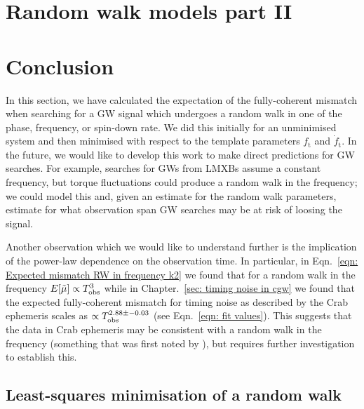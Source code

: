 \documentclass[../full_thesis/full_thesis.tex]{subfiles}
\newcommand{\thisdir}{../analytic_timing_noise_cgw}
\begin{document}
\section{Random walk models part II} 
\label{sec: Random walk models part II}


\section{Conclusion}

In this section, we have calculated the expectation of the fully-coherent
mismatch when searching for a GW signal which undergoes a random walk in one of
the phase, frequency, or spin-down rate. We did this initially for an
unminimised system and then minimised with respect to the template parameters
$f_\textrm{t}$ and $\dot{f}_\textrm{t}$. In the future, we would like to develop
this work to make direct predictions for GW searches. For example,
searches for GWs from LMXBs assume a constant frequency, but torque fluctuations
could produce a random walk in the frequency; we could model this and, given
an estimate for the random walk parameters, estimate for what observation span
GW searches may be at risk of loosing the signal.

Another observation which we would like to understand further is the
implication of the power-law dependence on the observation time. In particular,
in Eqn.~\eqref{eqn: Expected mismatch RW in frequency k2} we found that for
a random walk in the frequency
$E[\tilde{\mu}] \propto T_{\mathrm{obs}} ^{3}$ while in Chapter.~\ref{sec: timing noise in
cgw} we found that the expected fully-coherent mismatch for timing noise as
described by the Crab ephemeris scales as $\propto T_{\mathrm{obs}}^{2.88\pm-0.03}$ (see
Eqn.~\eqref{eqn: fit values}). This suggests that the data in Crab ephemeris
may be consistent with a random walk in the frequency (something that was
first noted by \citet{Boynton1972}), but requires further investigation to
establish this.


\begin{subappendices}


\section{Least-squares minimisation of a random walk}
\label{sec: least squares minimisation of a random walk}



\end{subappendices}


\biblio
\end{document}
